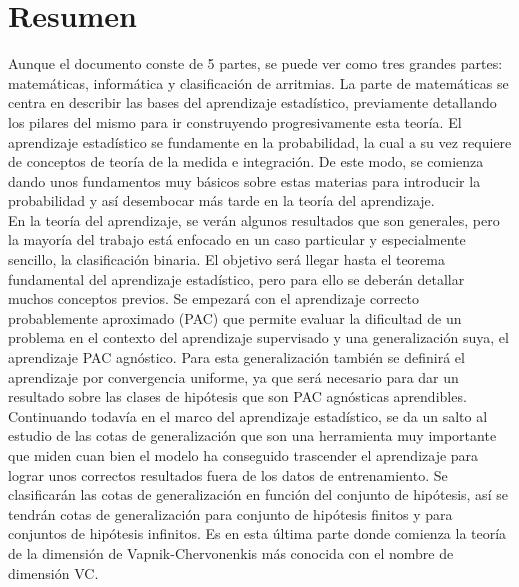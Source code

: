 %


\chapter{Resumen}


    Aunque el documento conste de 5 partes, se puede ver como tres grandes partes: matemáticas, informática y clasificación de arritmias. La parte de matemáticas se centra en describir las bases del aprendizaje estadístico, previamente detallando los pilares del mismo para ir construyendo progresivamente esta teoría. El aprendizaje estadístico se fundamente en la probabilidad, la cual a su vez requiere de conceptos de teoría de la medida e integración. De este modo, se comienza dando unos fundamentos muy básicos sobre estas materias para introducir la probabilidad y así desembocar más tarde en la teoría del aprendizaje.\\
    
    En la teoría del aprendizaje, se verán algunos resultados que son generales, pero la mayoría del trabajo está enfocado en un caso particular y especialmente sencillo, la clasificación binaria. El objetivo será llegar hasta el teorema fundamental del aprendizaje estadístico, pero para ello se deberán detallar muchos conceptos previos. Se empezará con el aprendizaje correcto probablemente aproximado (PAC) que permite evaluar la dificultad de un problema en el contexto del aprendizaje supervisado y una generalización suya, el aprendizaje PAC agnóstico. Para esta generalización también se definirá el aprendizaje por convergencia uniforme, ya que será necesario para dar un resultado sobre las clases de hipótesis que son PAC agnósticas aprendibles. \\
    
    Continuando todavía en el marco del aprendizaje estadístico, se da un salto al estudio de las cotas de generalización que son una herramienta muy importante que miden cuan bien el modelo ha conseguido trascender el aprendizaje para lograr unos correctos resultados fuera de los datos de entrenamiento. Se clasificarán las cotas de generalización en función del conjunto de hipótesis, así se tendrán cotas de generalización para conjunto de hipótesis finitos y para conjuntos de hipótesis infinitos. Es en esta última parte donde comienza la teoría de la dimensión de Vapnik-Chervonenkis más conocida con el nombre de dimensión VC. \\
    
